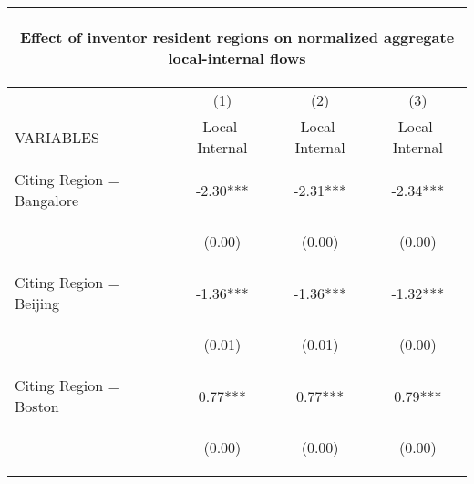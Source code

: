 \begin{center}
\begin{tabular}{lccc}
\multicolumn{4}{c}{\begin{large}Effect of inventor resident regions on normalized aggregate local-internal flows \label{localinternal}\end{large}} \\ \hline
 & (1) & (2) & (3) \\
VARIABLES & Local-Internal & Local-Internal & Local-Internal \\ \hline
\vspace{4pt} & \begin{footnotesize}\end{footnotesize} & \begin{footnotesize}\end{footnotesize} & \begin{footnotesize}\end{footnotesize} \\
Citing Region = Bangalore & -2.30*** & -2.31*** & -2.34*** \\
\vspace{4pt} & \begin{footnotesize}(0.00)\end{footnotesize} & \begin{footnotesize}(0.00)\end{footnotesize} & \begin{footnotesize}(0.00)\end{footnotesize} \\
Citing Region = Beijing & -1.36*** & -1.36*** & -1.32*** \\
\vspace{4pt} & \begin{footnotesize}(0.01)\end{footnotesize} & \begin{footnotesize}(0.01)\end{footnotesize} & \begin{footnotesize}(0.00)\end{footnotesize} \\
Citing Region = Boston & 0.77*** & 0.77*** & 0.79*** \\
\vspace{4pt} & \begin{footnotesize}(0.00)\end{footnotesize} & \begin{footnotesize}(0.00)\end{footnotesize} & \begin{footnotesize}(0.00)\end{footnotesize} \\

\end{tabular}
\end{center}
